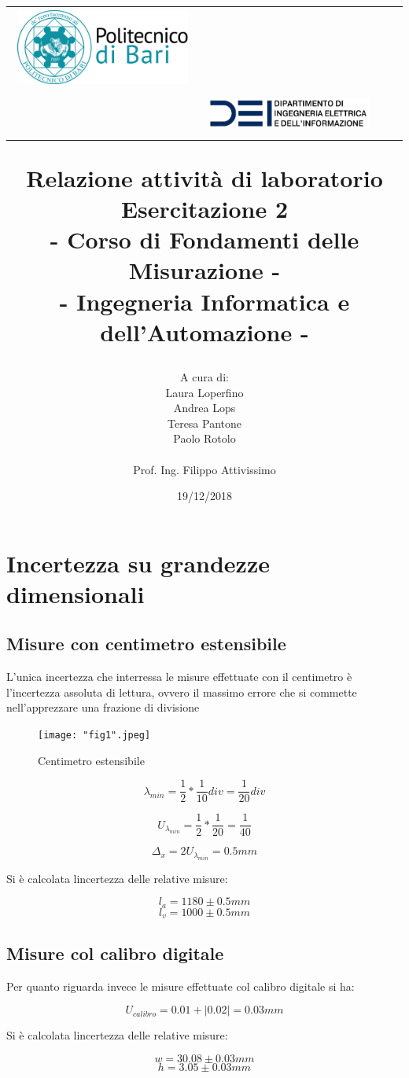 \documentclass[a4paper]{article}
\title{\begin{center}
		\setlength{\tabcolsep}{0pt}
		\begin{tabular}{>{\raggedleft}m{3cm}>{\centering}m{\textwidth - 5cm\relax}>{\raggedright}m{3cm}}
			\includegraphics[width=\linewidth]{poliba.png}%
			&%
			\textbf{ } \\[5pt]%
			\textbf{\ }%
			&%
			\includegraphics[width=\linewidth]{dei.png} %
		\end{tabular}
	\end{center}
	\textbf{Relazione attività di laboratorio\\}
	\textbf{\large Esercitazione 2\\- Corso di Fondamenti delle Misurazione -\\ }
	{\normalsize 
		- Ingegneria Informatica e dell'Automazione -
}}
\author{A cura di:\\
	Laura Loperfino\\
	Andrea Lops \\
	Teresa Pantone\\
	Paolo Rotolo\\
	\\
	Prof. Ing. Filippo Attivissimo
}
\date{19/12/2018}
\begin{document}
\maketitle

\lstset{language=Matlab}

\section {Incertezza su grandezze dimensionali}
\subsection{Misure con centimetro estensibile}
L'unica incertezza che interressa le misure effettuate con il centimetro è l'incertezza assoluta di lettura, ovvero il massimo errore che si commette nell'apprezzare una frazione di divisione

\begin{figure}[htp]
	\centering
	\texttt{[image: "fig1".jpeg]}
	\caption{Centimetro estensibile}
	\label{}
\end{figure}
\begin{Large} 
	\begin{equation}
	\lambda_{min}=\frac{1}{2}*\frac{1}{10} div= \frac{1}{20}div 
	\end{equation}
\end{Large}
\begin{Large} 
	\begin{equation}
	U_{\lambda_{min}}=\frac{1}{2}*\frac{1}{20} = \frac{1}{40} 
	\end{equation}
\end{Large}
\begin{Large} 
	\begin{equation}
	\Delta_x=2U_{\lambda_{min}} = 0.5 mm 
	\end{equation}
\end{Large}
Si è calcolata lincertezza delle relative misure: 
\begin{Large} 
	\begin{equation}
		l_a = 1180\pm0.5mm
	 \end{equation}
	 \begin{equation}
		l_v = 1000\pm0.5mm
	 \end{equation}
\end{Large}
\subsection{Misure col calibro digitale}
Per quanto riguarda invece le misure effettuate col calibro digitale si ha: 
\begin{Large} 
	\begin{equation}
		U_{calibro} = 0.01 + |0.02| = 0.03mm
	 \end{equation}
\end{Large}
Si è calcolata lincertezza delle relative misure: 
\begin{Large} 
	\begin{equation}
		w = 30.08\pm0.03mm
	 \end{equation}
	 \begin{equation}
		h = 3.05\pm0.03mm
	 \end{equation}
\end{Large}
\end{document}

